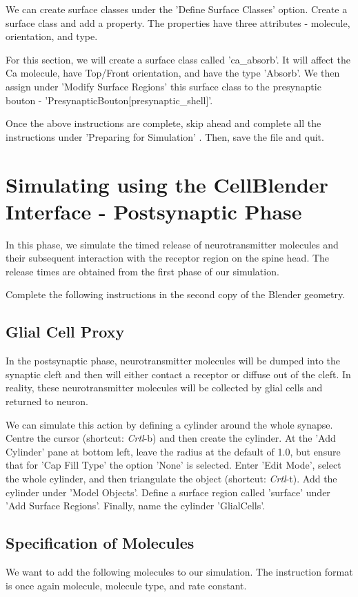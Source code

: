 \documentclass[twoside,a4paper]{refart}
\begin{document}
We can create surface classes under the 'Define Surface Classes' option. Create a surface class and add a property. The properties have three attributes - molecule, orientation, and type. 

For this section, we will create a surface class called 'ca\_absorb'. It will affect the Ca molecule, have Top/Front orientation, and have the type 'Absorb'. We then assign under 'Modify Surface Regions' this surface class to the presynaptic bouton - 'PresynapticBouton[presynaptic\_shell]'.
 
Once the above instructions are complete, skip ahead and complete all the instructions under 'Preparing for Simulation' . Then, save the file and quit.

\section{Simulating using the CellBlender Interface - Postsynaptic Phase}
In this phase, we simulate the timed release of neurotransmitter molecules and their subsequent interaction with the receptor region on the spine head. The release times are obtained from the first phase of our simulation.

Complete the following instructions in the second copy of the Blender geometry.
\subsection{Glial Cell Proxy}
In the postsynaptic phase, neurotransmitter molecules will be dumped into the synaptic cleft and then will either contact a receptor or diffuse out of the cleft. In reality, these neurotransmitter molecules will be collected by glial cells and returned to neuron.

We can simulate this action by defining a cylinder around the whole synapse. Centre the cursor (shortcut: \textit{Crtl}-b) and then create the cylinder. At the 'Add Cylinder' pane at bottom left, leave the radius at the default of 1.0, but ensure that for 'Cap Fill Type' the option 'None' is selected. Enter 'Edit Mode', select the whole cylinder, and then triangulate the object (shortcut: \textit{Crtl}-t). Add the cylinder under 'Model Objects'. Define a surface region called 'surface' under 'Add Surface Regions'. Finally, name the cylinder 'GlialCells'. 


\subsection{Specification of Molecules}
We want to add the following molecules to our simulation. The instruction format is once again molecule, molecule type, and rate constant.
\end{document}
